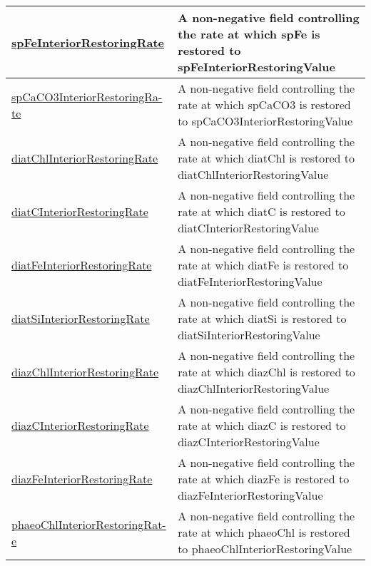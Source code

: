{\begin{center}
\begin{longtable}{| p{2.0in} | p{4.0in} |}
    \hline
    \hyperref[subsec:var_sec_tracersInteriorRestoringFields_spFeInteriorRestoringRate]{spFeInteriorRestoringRate} & A non-negative field controlling the rate at which spFe is restored to spFeInteriorRestoringValue \\
    \hline
    \hyperref[subsec:var_sec_tracersInteriorRestoringFields_spCaCO3InteriorRestoringRate]{spCaCO3InteriorRestoringRa-}\hyperref[subsec:var_sec_tracersInteriorRestoringFields_spCaCO3InteriorRestoringRate]{te}  & A non-negative field controlling the rate at which spCaCO3 is restored to spCaCO3InteriorRestoringValue \\
    \hline
    \hyperref[subsec:var_sec_tracersInteriorRestoringFields_diatChlInteriorRestoringRate]{diatChlInteriorRestoringRate} & A non-negative field controlling the rate at which diatChl is restored to diatChlInteriorRestoringValue \\
    \hline
    \hyperref[subsec:var_sec_tracersInteriorRestoringFields_diatCInteriorRestoringRate]{diatCInteriorRestoringRate} & A non-negative field controlling the rate at which diatC is restored to diatCInteriorRestoringValue \\
    \hline
    \hyperref[subsec:var_sec_tracersInteriorRestoringFields_diatFeInteriorRestoringRate]{diatFeInteriorRestoringRate} & A non-negative field controlling the rate at which diatFe is restored to diatFeInteriorRestoringValue \\
    \hline
    \hyperref[subsec:var_sec_tracersInteriorRestoringFields_diatSiInteriorRestoringRate]{diatSiInteriorRestoringRate} & A non-negative field controlling the rate at which diatSi is restored to diatSiInteriorRestoringValue \\
    \hline
    \hyperref[subsec:var_sec_tracersInteriorRestoringFields_diazChlInteriorRestoringRate]{diazChlInteriorRestoringRate} & A non-negative field controlling the rate at which diazChl is restored to diazChlInteriorRestoringValue \\
    \hline
    \hyperref[subsec:var_sec_tracersInteriorRestoringFields_diazCInteriorRestoringRate]{diazCInteriorRestoringRate} & A non-negative field controlling the rate at which diazC is restored to diazCInteriorRestoringValue \\
    \hline
    \hyperref[subsec:var_sec_tracersInteriorRestoringFields_diazFeInteriorRestoringRate]{diazFeInteriorRestoringRate} & A non-negative field controlling the rate at which diazFe is restored to diazFeInteriorRestoringValue \\
    \hline
    \hyperref[subsec:var_sec_tracersInteriorRestoringFields_phaeoChlInteriorRestoringRate]{phaeoChlInteriorRestoringRat-}\hyperref[subsec:var_sec_tracersInteriorRestoringFields_phaeoChlInteriorRestoringRate]{e}  & A non-negative field controlling the rate at which phaeoChl is restored to phaeoChlInteriorRestoringValue \\

\end{longtable}
\end{center}}
